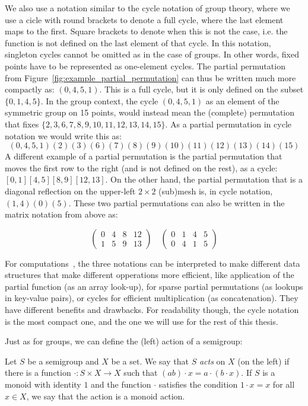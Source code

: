 We also use a notation similar to the cycle notation of group theory, where we use a cicle with round brackets to denote a full cycle, where the last element maps to the first.
Square brackets to denote when this is not the case, i.e. the function is not defined on the last element of that cycle. In this notation, singleton cycles cannot be omitted as in the case of groups.
In other words, fixed points have to be represented as one-element cycles.
The partial permutation from Figure~\ref{fig:example_partial_permutation} can thus be written much more compactly as: $(0,4,5,1)$.
This is a full cycle, but it is only defined on the subset $\{0,1,4,5\}$.
In the group context, the cycle $(0,4,5,1)$ as an element of the symmetric group on 15 points, would instead mean the (complete) permutation that fixes $\{2,3,6,7,8,9,10,11,12,13,14,15\}$.
As a partial permutation in cycle notation we would write this as: \[(0,4,5,1)(2)(3)(6)(7)(8)(9)(10)(11)(12)(13)(14)(15) \]
A different example of a partial permutation is the partial permutation that moves the first row to the right (and is not defined on the rest), as a cycle: $[0,1][4,5][8,9][12,13]$.
On the other hand, the partial permutation that is a diagonal reflection on the upper-left $2 \times 2$ (sub)mesh is, in cycle notation, $(1,4)(0)(5)$.
These two partial permutations can also be written in the matrix notation from above as:

\begin{equation*}
\left(
\begin{array}{llll}
0 & 4 & 8 & 12 \\
1 & 5 & 9 & 13 
\end{array}
\right)
\quad
\left(
\begin{array}{llll}
0 & 1 & 4 & 5 \\
0 & 4 & 1 & 5
\end{array}
\right)
\end{equation*}

For computations~\cite{east2019semigroups}, the three notations can be interpreted to make different data structures that make different opperations more efficient, like application of the partial function (as an array look-up), for sparse partial permutations (as lookups in key-value pairs), or cycles for efficient multiplication (as concatenation). They have different benefits and drawbacks. For readability though, the cycle notation is the most compact one, and the one we will use for the rest of this thesis.

Just as for groups, we can define the (left) action of a semigroup:
\begin{defn}
Let $S$ be a semigroup and $X$ be a set. We say that $S$ \emph{acts} on $X$ (on the left) if there is a function $\cdot : S \times X \rightarrow X$ such that $(ab) \cdot x = a \cdot (b \cdot x)$. If $S$ is a monoid with identity $1$ and the function $\cdot$ satisfies the condition $1 \cdot x = x$ for all $x \in X$, we say that the action is a monoid action.
\end{defn}

